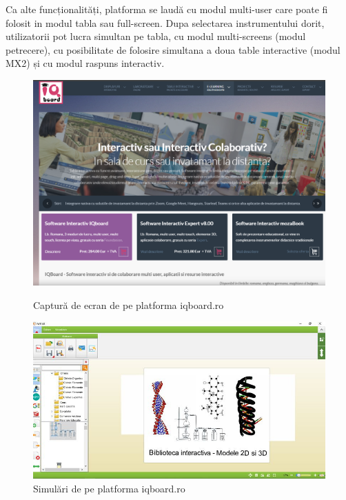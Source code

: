 Ca alte funcționalități, platforma se laudă cu modul multi-user care poate fi folosit in modul tabla sau full-screen.
Dupa selectarea instrumentului dorit, utilizatorii pot lucra simultan pe tabla, cu modul multi-screens (modul petrecere), 
cu posibilitate de folosire simultana a doua table interactive (modul MX2) și cu modul raspuns interactiv.

\begin{figure}[htb]
    \centering
    \begin{minipage}[b]{0.49\textwidth}
        \centering
        \includegraphics[width=\textwidth]{imgs/iqboard.png}
        \caption{Captură de ecran de pe platforma iqboard.ro}
        \label{fig:iqboard}
    \end{minipage}
    \hfill
    \begin{minipage}[b]{0.49\textwidth}
        \centering
        \includegraphics[width=\textwidth]{imgs/iqboardsimulari.jpg}
        \caption{Simulări de pe platforma iqboard.ro}
        \label{fig:iqboardsimulari}
    \end{minipage}
\end{figure}


